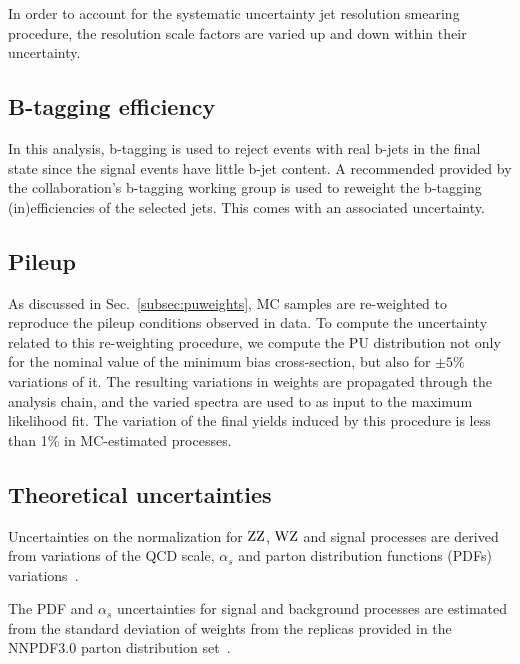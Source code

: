 In order to account for the systematic uncertainty jet resolution smearing procedure, the resolution scale factors are varied up and down within their uncertainty.

\subsection{B-tagging efficiency}

In this analysis, b-tagging is used to reject events with real b-jets in 
the final state since the signal events have little b-jet content. 
A recommended provided by the collaboration's b-tagging working group is used
to reweight the b-tagging (in)efficiencies of the selected jets.
This comes with an associated uncertainty.

\subsection{Pileup}

As discussed in Sec.~\ref{subsec:puweights}, MC samples are re-weighted to
reproduce the pileup conditions observed in data.
To compute the uncertainty related to this re-weighting procedure, we compute the PU distribution not only for the nominal value of the minimum bias cross-section,
but also for $\pm5\%$ variations of it.
The resulting variations in weights are propagated through the analysis chain, 
and the varied \met spectra are used to as input to the maximum likelihood fit.
The variation of the final yields induced by this procedure is less than 1\% in MC-estimated processes.


\subsection{Theoretical uncertainties}
\label{subsec:dmtheo}

Uncertainties on the normalization for $\mathrm{Z}\mathrm{Z}$, $\mathrm{W}\mathrm{Z}$ and signal
processes are derived from variations of the QCD scale, $\alpha_{s}$
and parton distribution functions (PDFs)
variations~\cite{Botje:2011sn,Alekhin:2011sk,Lai:2010vv,Martin:2009iq,Ball:2011mu,MCFM}. 

The PDF and $\alpha_s$ uncertainties for signal and background processes are estimated 
from the standard deviation of weights from the replicas provided in the 
NNPDF3.0 parton distribution set~\cite{nnpdf}.

